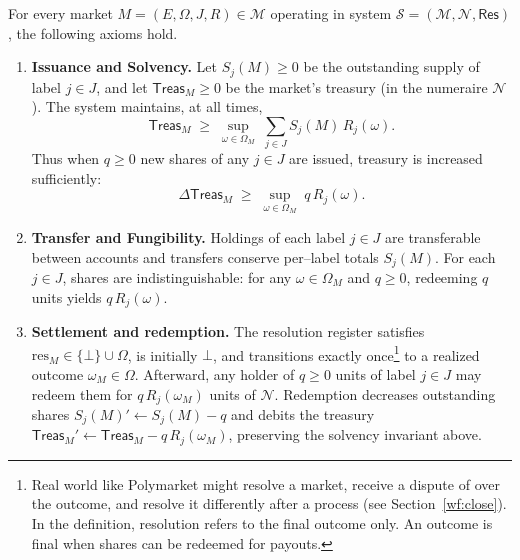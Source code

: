 \begin{definition}\label{def:system} For every market $M=(E,\Omega,J,R)\in\mathcal{M}$ operating in system $\mathcal{S}=(\mathcal{M},\mathcal{N},\mathsf{Res})$, the following axioms hold.

\begin{enumerate}

\item \textbf{Issuance and Solvency.}
Let $S_j(M)\ge 0$ be the outstanding supply of label $j\in J$, and let $\mathsf{Treas}_M\ge 0$ be the market’s treasury (in the numeraire $\mathcal{N}$). The system maintains, at all times,
\begin{equation}
  \mathsf{Treas}_M \;\ge\; \sup_{\omega\in\Omega_M}\; \sum_{j\in J} S_j(M)\,R_j(\omega).
\end{equation}
Thus when $q\ge 0$ new shares of any $j\in J$ are issued, treasury is increased sufficiently:
\begin{equation}
  \Delta \mathsf{Treas}_M \;\ge\; \sup_{\omega\in\Omega_M}\; q\,R_j(\omega).
\end{equation}

\item \textbf{Transfer and Fungibility.} Holdings of each label $j\in J$ are transferable between accounts and transfers conserve per–label totals $S_j(M)$. For each $j\in J$, shares are indistinguishable: for any $\omega\in\Omega_M$ and $q\ge 0$, redeeming $q$ units yields $q\,R_j(\omega)$.
  
\item \textbf{Settlement and redemption.} The resolution register satisfies $\mathrm{res}_M\in\{\bot\}\cup\Omega$, is initially $\bot$, and transitions exactly once\footnote{Real world \depms like Polymarket might resolve a market, receive a dispute of over the outcome, and resolve it differently after a process (see Section~\ref{wf:close}). In the definition, resolution refers to the final outcome only. An outcome is final when shares can be redeemed for payouts.} to a realized outcome $\omega_M\in\Omega$. Afterward, any holder of $q\ge 0$ units of label $j\in J$ may redeem them for $q\,R_j(\omega_M)$ units of $\mathcal{N}$. Redemption decreases outstanding shares $S_j(M)'\leftarrow S_j(M)-q$ and debits the treasury $\mathsf{Treas}_M'\leftarrow \mathsf{Treas}_M - q\,R_j(\omega_M)$, preserving the solvency invariant above.
 
 \end{enumerate}
 \end{definition}



